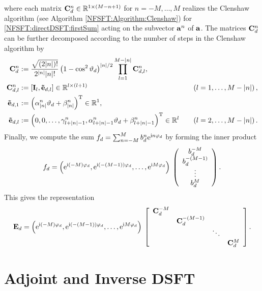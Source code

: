 where each matrix $\mathbf{C}^{n}_{d} \in \mathbb{R}^{1 \times (M-n+1)}$ for $n = -M,\ldots,M$ realizes the Clenshaw algorithm 
(see Algorithm \ref{NFSFT:Algorithm:Clenshaw}) for \eqref{NFSFT:directDSFT:firstSum} acting on the subvector $\mathbf{a}^n$ of $\mathbf{a}$.
The matrices $\mathbf{C}_{d}^n$ can be further decomposed according to the number of steps in the Clenshaw algorithm by
\begin{align*}
  \mathbf{C}^{n}_{d}       
  & := \frac{\sqrt{(2|n|)!}}{2^{|n|} |n|!} 
       \left(1-\cos^2\vartheta_{d}\right)^{|n|/2}
       \prod_{l=1}^{M-|n|} \mathbf{C}_{d,l}^{n},\\
  \mathbf{C}_{d,l}^{n}     
  & := \left[\mathbf{I}_{l}, \mathbf{\tilde{e}}_{d,l}\right] \in \mathbb{R}^{l \times (l+1)} 
  & \quad \left(l=1,\ldots,M-|n|\right),\\
  \mathbf{\tilde{e}}_{d,1} 
  & := \left(\alpha_{|n|}^n \vartheta_{d} + \beta_{|n|}^n\right)^{\text{\rm{T}}} 
       \in \mathbb{R}^{1},\\
  \mathbf{\tilde{e}}_{d,l} 
  & := \left(0,0,\ldots,\gamma_{l+|n|-1}^n,\alpha_{l+|n|-1}^n 
       \vartheta_{d} + \beta_{l+|n|-1}^n\right)^{\text{\rm{T}}} \in \mathbb{R}^{l} 
  & \quad \left(l=2,\ldots,M-\left\vert n\right\vert\right).
\end{align*}
Finally, we compute the sum
$%
  f_{d} = \sum_{n=-M}^M b^{n}_{d} \e^{\im n \vphi_{d}}
$ %
by forming the inner product
\[
  f_{d} 
  = 
  \left(\mbox{\rm{e}}^{\mbox{\scriptsize\rm{i}} (-M) \varphi_{d}},\mbox{\rm{e}}^{\mbox{\scriptsize\rm{i}} (-(M-1)) \varphi_{d}},\ldots,\mbox{\rm{e}}^{\mbox{\scriptsize\rm{i}} M \varphi_{d}}\right)
  \:   
  \left(\begin{array}{c}
    b^{-M}_{d}\\
    b^{-(M-1)}_{d}\\
    \vdots\\
    b^{M}_{d}
  \end{array}\right).
\]
This gives the representation
\[
  \mathbf{E}_{d} = \left(\mbox{\rm{e}}^{\mbox{\scriptsize\rm{i}} (-M) \varphi_{d}},\mbox{\rm{e}}^{\mbox{\scriptsize\rm{i}} (-(M-1)) \varphi_{d}},\ldots,\mbox{\rm{e}}^{\mbox{\scriptsize\rm{i}} M \varphi_{d}}\right) \:  
  \left[\begin{array}{cccc}
    \mathbf{C}^{-M}_{d} &                    &        &               \\
                   & \mathbf{C}^{-(M-1)}_{d} &        &               \\
                   &                    & \ddots &               \\
                   &                    &        & \mathbf{C}^{M}_{d} 
  \end{array}\right].
\]

\section{Adjoint and Inverse DSFT}

